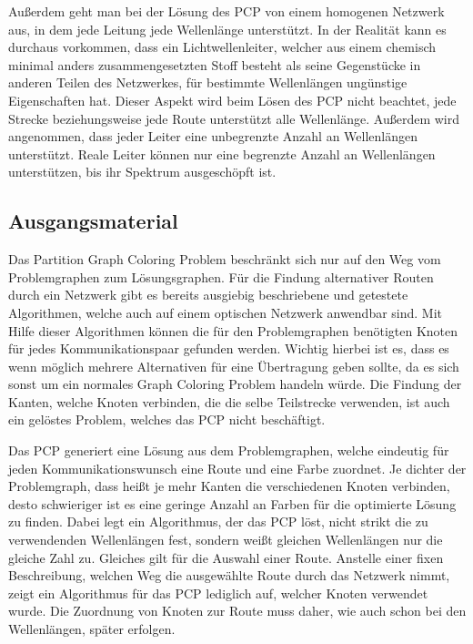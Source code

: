 Außerdem geht man bei der Lösung des PCP von einem homogenen Netzwerk aus, in dem jede Leitung jede Wellenlänge unterstützt. In der Realität kann es durchaus vorkommen, dass ein
Lichtwellenleiter, welcher aus einem chemisch minimal anders zusammengesetzten Stoff besteht als seine Gegenstücke in anderen Teilen des Netzwerkes, für bestimmte Wellenlängen
ungünstige Eigenschaften hat. Dieser Aspekt wird beim Lösen des PCP nicht beachtet, jede Strecke beziehungsweise jede Route unterstützt alle Wellenlänge. Außerdem wird angenommen, 
dass jeder Leiter eine unbegrenzte Anzahl an Wellenlängen unterstützt. Reale Leiter können nur eine begrenzte Anzahl an Wellenlängen unterstützen, bis ihr Spektrum ausgeschöpft ist.

\subsection{Ausgangsmaterial}
Das Partition Graph Coloring Problem beschränkt sich nur auf den Weg vom Problemgraphen zum Lösungsgraphen. Für die Findung alternativer Routen durch ein Netzwerk gibt es 
bereits ausgiebig beschriebene und getestete Algorithmen, welche auch auf einem optischen Netzwerk anwendbar sind. Mit Hilfe dieser Algorithmen können die für den
Problemgraphen benötigten Knoten für jedes Kommunikationspaar gefunden werden. Wichtig hierbei ist es, dass es wenn möglich mehrere Alternativen für eine Übertragung geben sollte,
da es sich sonst um ein normales Graph Coloring Problem handeln würde. Die Findung der Kanten, welche Knoten verbinden, die die selbe Teilstrecke verwenden, ist auch ein
gelöstes Problem, welches das PCP nicht beschäftigt.

Das PCP generiert eine Lösung aus dem Problemgraphen, welche eindeutig für jeden Kommunikationswunsch eine Route und eine Farbe zuordnet. Je dichter der Problemgraph, dass heißt
je mehr Kanten die verschiedenen Knoten verbinden, desto schwieriger ist es eine geringe Anzahl an Farben für die optimierte Lösung zu finden. Dabei legt ein Algorithmus, der das
PCP löst, nicht strikt die zu verwendenden Wellenlängen fest, sondern weißt gleichen Wellenlängen nur die gleiche Zahl zu. Gleiches gilt für die Auswahl einer Route. Anstelle
einer fixen Beschreibung, welchen Weg die ausgewählte Route durch das Netzwerk nimmt, zeigt ein Algorithmus für das PCP lediglich auf, welcher Knoten verwendet wurde. 
Die Zuordnung von Knoten zur Route muss daher, wie auch schon bei den Wellenlängen, später erfolgen.

